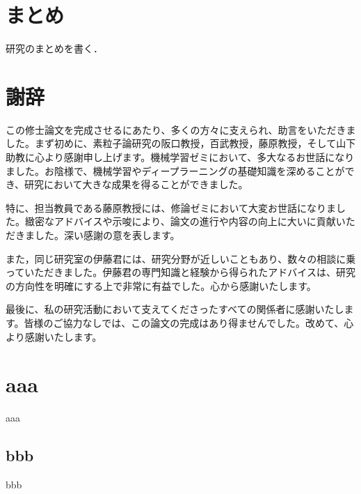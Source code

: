 \documentclass[a4paper,11pt]{jsreport}
\begin{document}


\chapter*{まとめ}
研究のまとめを書く．

\chapter*{謝辞} %
この修士論文を完成させるにあたり、多くの方々に支えられ、助言をいただきました。まず初めに、素粒子論研究の阪口教授，百武教授，藤原教授，そして山下助教に心より感謝申し上げます。機械学習ゼミにおいて、多大なるお世話になりました。お陰様で、機械学習やディープラーニングの基礎知識を深めることができ、研究において大きな成果を得ることができました。\par
特に、担当教員である藤原教授には、修論ゼミにおいて大変お世話になりました。緻密なアドバイスや示唆により、論文の進行や内容の向上に大いに貢献いただきました。深い感謝の意を表します。\par
また，同じ研究室の伊藤君には、研究分野が近しいこともあり、数々の相談に乗っていただきました。伊藤君の専門知識と経験から得られたアドバイスは、研究の方向性を明確にする上で非常に有益でした。心から感謝いたします。\par
最後に、私の研究活動において支えてくださったすべての関係者に感謝いたします。皆様のご協力なしでは、この論文の完成はあり得ませんでした。改めて、心より感謝いたします。


\renewcommand{\bibname}{参考文献} %

\appendix
\renewcommand{\thechapter}{\Alph{chapter}}
\renewcommand{\thesection}{\Alph{chapter}.\arabic{section}}
\setcounter{section}{0}
\renewcommand{\theequation}{\Alph{chapter}.\arabic{equation}}
\setcounter{equation}{0}

\chapter{aaa}
aaa
\section{bbb}
bbb
\end{document}
